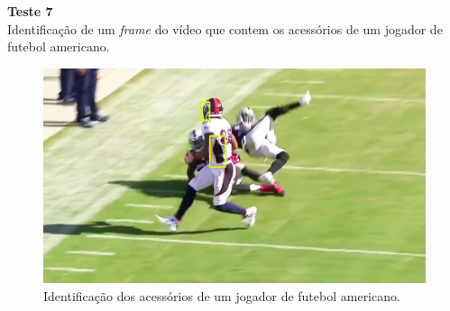 \textbf{Teste 7}\\
Identificação de um \textit{frame} do vídeo que contem os acessórios de um jogador de futebol americano.
\begin{figure}
    \centering
    \caption{Identificação dos acessórios de um jogador de futebol americano.}
    \includegraphics[scale=0.2]{05-SLIDES_DESENVOLVIMENTO/Etapa_de_Testes/imagens_testes/identificacao_jogadores_fa5.png}
\end{figure}